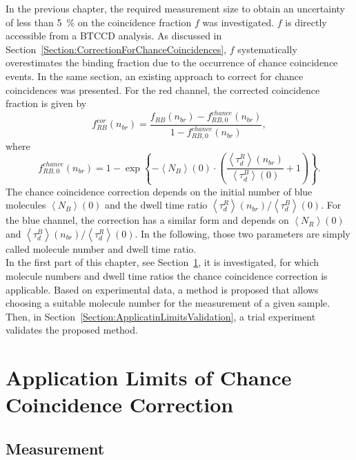In the previous chapter, the required measurement size to obtain an uncertainty of less than \SI{5}{\percent} on the coincidence fraction $f$ was investigated. $f$ is directly accessible from a \gls{BTCCD} analysis. As discussed in Section~\ref{Section:CorrectionForChanceCoincidences}, $f$ systematically overestimates the binding fraction due to the occurrence of chance coincidence events. In the same section, an existing approach to correct for chance coincidences was presented. For the red channel, the corrected coincidence fraction is given by
\begin{equation} \label{Equation:CorrectedCoincidenceFractionRed2}
f_{RB}^{cor}(n_{br}) = \frac{f_{RB}(n_{br}) - f_{RB, 0}^{chance}(n_{br})}{1 - f_{RB, 0}^{chance}(n_{br})},
\end{equation}
where
\begin{equation} \label{Equation:ChanceCoincidenceFractionRed2}
f_{RB, 0}^{chance}(n_{br}) = 1 - \exp\left\{-\left\langle N_B \right\rangle (0) \cdot \left(\frac{\left\langle \tau_d^R\right\rangle (n_{br})}{\left\langle \tau_d^B \right\rangle (0)} + 1\right)\right\}.
\end{equation}
The chance coincidence correction depends on the initial number of blue molecules $\left\langle N_B \right\rangle (0)$ and the dwell time ratio $\left\langle \tau_d^R\right\rangle (n_{br})/ \left\langle \tau_d^B \right\rangle (0)$. For the blue channel, the correction has a similar form and depends on $\left\langle N_R \right\rangle (0)$ and $\left\langle \tau_d^B\right\rangle (n_{br})/ \left\langle \tau_d^R \right\rangle (0)$. In the following, those two parameters are simply called molecule number and dwell time ratio.\\

In the first part of this chapter, see Section~\ref{Section:ApplicationLimits}, it is investigated, for which molecule numbers and dwell time ratios the chance coincidence correction is applicable. Based on experimental data, a method is proposed that allows choosing a suitable molecule number for the measurement of a given sample. Then, in Section~\ref{Section:ApplicatinLimitsValidation}, a trial experiment validates the proposed method.

\section{Application Limits of Chance Coincidence Correction} \label{Section:ApplicationLimits}

\subsection{Measurement} \label{Section:Measurement_Ribosomes_DNA}

